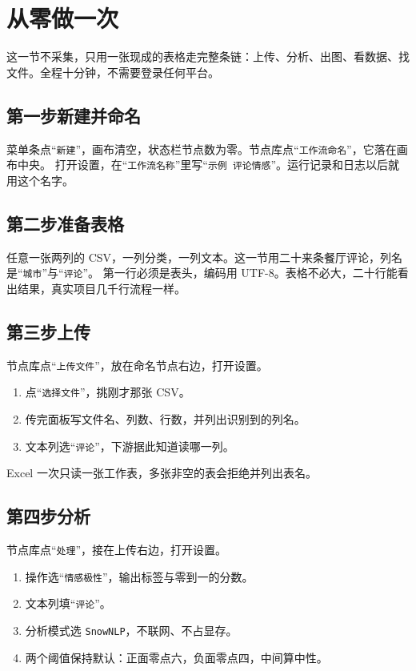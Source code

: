 \section{从零做一次}

这一节不采集，只用一张现成的表格走完整条链：上传、分析、出图、看数据、找文件。全程十分钟，不需要登录任何平台。

\subsection{第一步\quad 新建并命名}

菜单条点“\texttt{新建}”，画布清空，状态栏节点数为零。节点库点“\texttt{工作流命名}”，它落在画布中央。
打开设置，在“\texttt{工作流名称}”里写“\texttt{示例 评论情感}”。运行记录和日志以后就用这个名字。

\subsection{第二步\quad 准备表格}

任意一张两列的 CSV，一列分类，一列文本。这一节用二十来条餐厅评论，列名是“\texttt{城市}”与“\texttt{评论}”。
第一行必须是表头，编码用 UTF-8。表格不必大，二十行能看出结果，真实项目几千行流程一样。

\subsection{第三步\quad 上传}

节点库点“\texttt{上传文件}”，放在命名节点右边，打开设置。

\begin{enumerate}
\item 点“\texttt{选择文件}”，挑刚才那张 CSV。
\item 传完面板写文件名、列数、行数，并列出识别到的列名。
\item 文本列选“\texttt{评论}”，下游据此知道读哪一列。
\end{enumerate}

Excel 一次只读一张工作表，多张非空的表会拒绝并列出表名。

\subsection{第四步\quad 分析}

节点库点“\texttt{处理}”，接在上传右边，打开设置。

\begin{enumerate}
\item 操作选“\texttt{情感极性}”，输出标签与零到一的分数。
\item 文本列填“\texttt{评论}”。
\item 分析模式选 \texttt{SnowNLP}，不联网、不占显存。
\item 两个阈值保持默认：正面零点六，负面零点四，中间算中性。
\end{enumerate}

